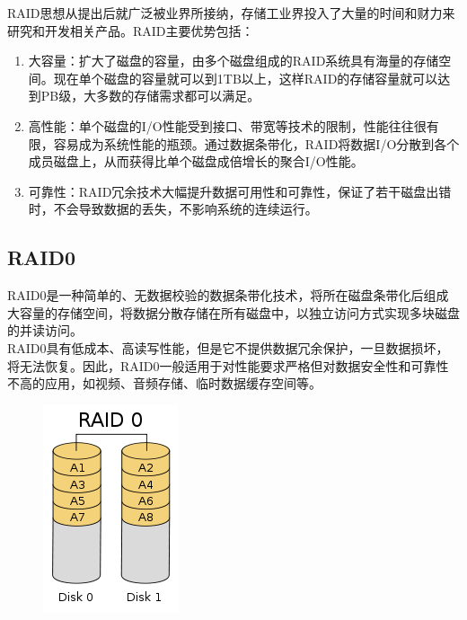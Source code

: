 RAID思想从提出后就广泛被业界所接纳，存储工业界投入了大量的时间和财力来研究和开发相关产品。RAID主要优势包括：

\begin{enumerate}
    \item 大容量：扩大了磁盘的容量，由多个磁盘组成的RAID系统具有海量的存储空间。现在单个磁盘的容量就可以到1TB以上，这样RAID的存储容量就可以达到PB级，大多数的存储需求都可以满足。

    \item 高性能：单个磁盘的I/O性能受到接口、带宽等技术的限制，性能往往很有限，容易成为系统性能的瓶颈。通过数据条带化，RAID将数据I/O分散到各个成员磁盘上，从而获得比单个磁盘成倍增长的聚合I/O性能。

    \item 可靠性：RAID冗余技术大幅提升数据可用性和可靠性，保证了若干磁盘出错时，不会导致数据的丢失，不影响系统的连续运行。
\end{enumerate}

\vspace{0.5cm}

\subsection{RAID0}

RAID0是一种简单的、无数据校验的数据条带化技术，将所在磁盘条带化后组成大容量的存储空间，将数据分散存储在所有磁盘中，以独立访问方式实现多块磁盘的并读访问。\\

RAID0具有低成本、高读写性能，但是它不提供数据冗余保护，一旦数据损坏，将无法恢复。因此，RAID0一般适用于对性能要求严格但对数据安全性和可靠性不高的应用，如视频、音频存储、临时数据缓存空间等。

\begin{figure}[H]
    \centering
    \includegraphics[]{img/C4/4-5/1.png}
\end{figure}

\vspace{0.5cm}

